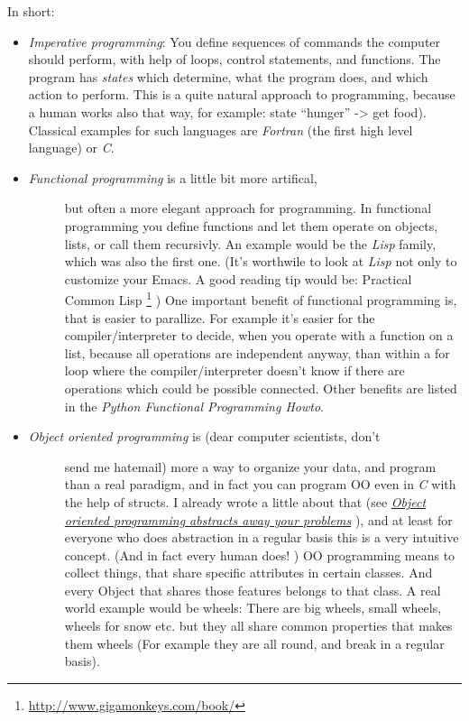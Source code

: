 \documentclass[letterpaper,10pt,english]{manual}
\begin{document}
In short:
\begin{itemize}
\item {} 
\emph{Imperative programming}: You define sequences of
commands the computer should perform, with help of loops,
control statements, and functions. The program has \emph{states}
which determine, what the program does, and which action to
perform. This is a quite natural approach to programming, because
a human works also that way, for example: state ``hunger'' -\textgreater{} get
food). Classical examples for such languages are \emph{Fortran} (the
first high level language) or \emph{C}.

\item {} \begin{description}
\item[\emph{Functional programming} is a little bit more artifical,] \leavevmode
but often a more elegant
approach for programming. In functional programming you define
functions and let them operate on objects, lists, or call them
recursivly. An example would be the \emph{Lisp} family, which was
also the first one. (It's worthwile to look at \emph{Lisp} not only
to customize your Emacs. A good reading tip would be: Practical
Common Lisp \footnote{
\href{http://www.gigamonkeys.com/book/}{http://www.gigamonkeys.com/book/}
} ) One important benefit of functional programming
is, that is easier to parallize. For example it's easier for the
compiler/interpreter to decide, when you operate with a function on a list,
because all operations are independent anyway, than within a for
loop where the compiler/interpreter doesn't know if there are operations
which could be possible connected. Other benefits are listed in
the \emph{Python Functional Programming Howto}.

\end{description}

\item {} \begin{description}
\item[\emph{Object oriented programming} is (dear computer scientists, don't] \leavevmode
send me hatemail) more a way to organize your data, and program
than a real paradigm, and in fact you can program OO even in \emph{C}
with the help of structs. I already wrote a little about
that (see \hyperlink{oo-ref}{\emph{Object oriented programming abstracts away your problems}} ), and at least for everyone who does
abstraction in a regular  basis this is a very intuitive concept.
(And in fact every human does! )
OO programming means to collect things, that share specific
attributes in certain classes. And every Object that shares
those features belongs to that class. A real world example
would be wheels: There are big wheels, small wheels, wheels
for snow etc. but they all share common properties that makes
them wheels (For example they are all round,
and break in a regular basis).

\end{description}

\end{itemize}
\end{document}
